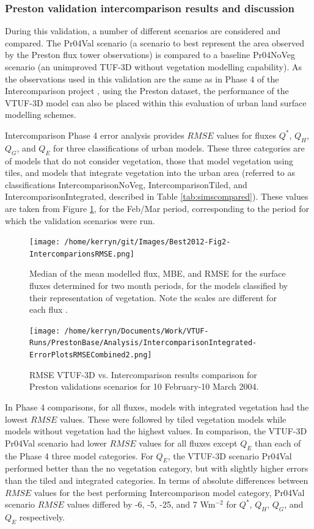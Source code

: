 \documentclass[preprint,12pt,authoryear]{elsarticle}
\begin{document}
\subsubsection{Preston validation intercomparison results and discussion}\label{sec:interresults}
During this validation, a number of different scenarios are considered and compared. The Pr04Val scenario (a scenario to best represent the area observed by the Preston flux tower observations) is compared to a baseline Pr04NoVeg scenario (an unimproved TUF-3D without vegetation modelling capability). As the observations used in this validation are the same as in Phase 4 of the Intercomparison project \citep{Best2012}, using the \cite{Coutts2007} Preston dataset, the performance of the VTUF-3D model can also be placed within this evaluation of urban land surface modelling schemes. 

Intercomparison Phase 4 error analysis provides $RMSE$ values for fluxes $Q^{*}$, $Q_{H}$, $Q_{G}$, and $Q_{E}$ for three classifications of urban models. These three categories are of models that do not consider vegetation, those that model vegetation using tiles, and models that integrate vegetation into the urban area (referred to as classifications IntercomparisonNoVeg, IntercomparisonTiled, and IntercomparisonIntegrated, described in Table \ref{tab:simscompared}). These values are taken from Figure \ref{fig:best2012RMSE}, for the Feb/Mar period, corresponding to the period for which the validation scenarios were run.

\begin{figure}[!htbp]
\texttt{[image: /home/kerryn/git/Images/Best2012-Fig2-IntercomparionsRMSE.png]} \caption{Median of the mean modelled flux, MBE, and RMSE for the surface fluxes determined for two month periods, for the models classified by their representation of vegetation. Note the scales are different for each flux \citep{Best2012}. \label{fig:best2012RMSE}}  
\end{figure}

\begin{figure}[!htbp] 
\texttt{[image: /home/kerryn/Documents/Work/VTUF-Runs/PrestonBase/Analysis/IntercomparisonIntegrated-ErrorPlotsRMSECombined2.png]}
\caption{RMSE VTUF-3D vs. Intercomparison results comparison for Preston validations scenarios for 10 February-10 March 2004.\label{fig:prestonrmse}}      
\end{figure}

In Phase 4 comparisons, for all fluxes, models with integrated vegetation had the lowest $RMSE$ values. These were followed by tiled vegetation models while models without vegetation had the highest values. In comparison, the VTUF-3D Pr04Val scenario had lower $RMSE$ values for all fluxes except $Q_{E}$ than each of the Phase 4 three model categories. For $Q_{E}$, the VTUF-3D scenario Pr04Val performed better than the no vegetation category, but with slightly higher errors than the tiled and integrated categories. In terms of absolute differences between $RMSE$ values for the best performing Intercomparison model category, Pr04Val scenario $RMSE$ values differed by -6, -5, -25, and 7 Wm$^{-2}$ for $Q^{*}$, $Q_{H}$, $Q_{G}$, and $Q_{E}$ respectively.
\end{document}
